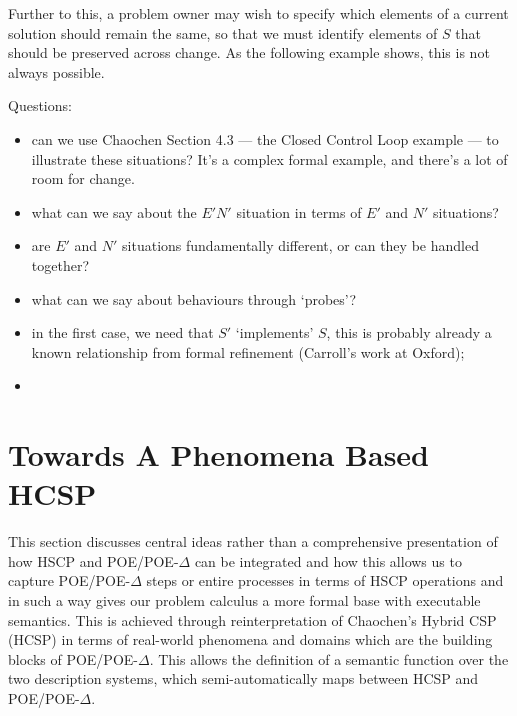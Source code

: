 \documentclass[runningheads,a4paper]{llncs}
\begin{document}
Further to this, a problem owner may wish to specify which elements of a current solution should remain the same, so that we must identify elements of $S$ that should be preserved across change. As the following example shows, this is not always possible.



Questions:
%
\begin{itemize}
\item can we use Chaochen Section 4.3 --- the Closed Control Loop example --- to illustrate these situations? It's a complex formal example, and there's a lot of room for change.
\item what can we say about the $E'N'$ situation in terms of $E'$ and $N'$ situations?
\item are $E'$ and $N'$ situations fundamentally different, or can they be handled together? 
\item what can we say about behaviours through `probes'?
\item in the first case, we need that $S'$ `implements' $S$, this is probably already a known relationship from formal refinement (Carroll's work at Oxford);
\item 
\end{itemize}



             \section{Towards A Phenomena Based HCSP}
             \label{subsect:phenomhcsp}
             This section discusses central ideas rather than a
             comprehensive presentation of how HSCP and POE/POE-$\Delta$
             can be integrated and how this allows us to capture
             POE/POE-$\Delta$ steps or entire processes in terms of
             HSCP operations and in such a way gives our problem
             calculus a more formal base with executable
             semantics. This is achieved through reinterpretation of
             Chaochen's Hybrid CSP (HCSP) \cite{chaochen1996formal} in
             terms of real-world phenomena and domains which are the
             building blocks of POE/POE-$\Delta$. This allows the
             definition of a semantic function over the two
             description systems, which semi-automatically maps
             between HCSP and POE/POE-$\Delta$.
\end{document}

